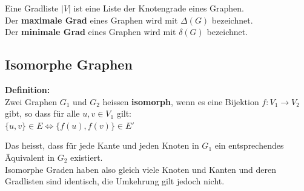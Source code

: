 \documentclass[12pt]{scrartcl}
\begin{document}
Eine Gradliste $|V|$ ist eine Liste der Knotengrade eines Graphen.\\

Der \textbf{maximale Grad} eines Graphen wird mit $\Delta (G)$ bezeichnet.\\
Der \textbf{minimale Grad} eines Graphen wird mit $\delta (G)$ bezeichnet.\\



\subsection{Isomorphe Graphen}
\textbf{Definition:}\\
Zwei Graphen $G_1$ und $G_2$ heissen \textbf{isomorph}, wenn es eine Bijektion $f: V_1 \rightarrow V_2$ gibt, so dass für alle $u,v \in V_1$ gilt:\\
$\{u,v\} \in E \Longleftrightarrow \{f(u),f(v)\} \in E'$

Das heisst, dass für jede Kante und jeden Knoten in $G_1$ ein entsprechendes Äquivalent in $G_2$ existiert.\\

Isomorphe Graden haben also gleich viele Knoten und Kanten und deren Gradlisten sind identisch, die Umkehrung gilt jedoch nicht.





\end{document}
